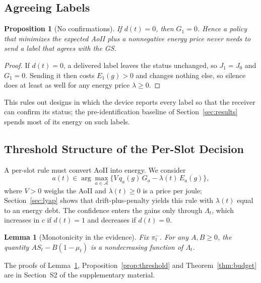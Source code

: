 \documentclass[10pt,journal,compsoc]{IEEEtran}
\newtheorem{lemma}{Lemma}
\newtheorem{proposition}{Proposition}
\theoremstyle{remark}
\newcommand{\A}{\mathcal{A}}
\begin{document}
\subsection{Agreeing Labels}

\begin{proposition}[No confirmations]\label{prop:confirm}
If $d(t)=0$, then $G_1=0$. Hence a policy that minimizes the expected AoII plus a nonnegative energy price never needs to send a label that agrees with the GS.
\end{proposition}
\begin{proof}
If $d(t)=0$, a delivered label leaves the status unchanged, so $J_1=J_0$ and $G_1=0$. Sending it then costs $E_1(g)>0$ and changes nothing else, so silence does at least as well for any energy price $\lambda\ge0$.
\end{proof}

This rules out designs in which the device reports every label so that the receiver can confirm its status; the pre-identification baseline of Section~\ref{sec:results} spends most of its energy on such labels.

\subsection{Threshold Structure of the Per-Slot Decision}
A per-slot rule must convert AoII into energy. We consider
\begin{equation}\label{eq:rule}
a(t)\in\arg\max_{a\in\A}\big\{V\,q_a(g)\,G_a-\lambda(t)\,E_a(g)\big\},
\end{equation}
where $V>0$ weighs the AoII and $\lambda(t)\ge0$ is a price per joule; Section~\ref{sec:lyap} shows that drift-plus-penalty yields this rule with $\lambda(t)$ equal to an energy debt. The confidence enters the gains only through $\Lambda_t$, which increases in $c$ if $d(t)=1$ and decreases if $d(t)=0$.


\begin{lemma}[Monotonicity in the evidence]\label{lem:mono}
Fix $\pi^-_t$. For any $A,B\ge0$, the quantity $AS_t-B(1-\mu_t)$ is a nondecreasing function of $\Lambda_t$.
\end{lemma}

The proofs of Lemma~\ref{lem:mono}, Proposition~\ref{prop:threshold} and Theorem~\ref{thm:budget} are in Section~S2 of the supplementary material.
\end{document}
